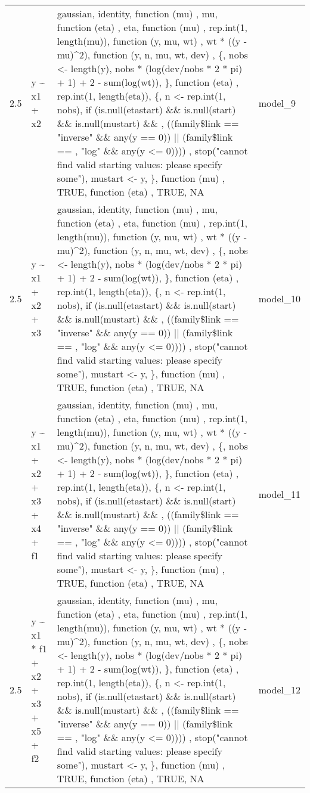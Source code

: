 \begin{tabular}{rlll}
2.5 & y \textasciitilde{} x1 + x2 & gaussian, identity, function (mu) , mu, function (eta) , eta, function (mu) , rep.int(1, length(mu)), function (y, mu, wt) , wt * ((y - mu)\textasciicircum{}2), function (y, n, mu, wt, dev) , \{,     nobs <- length(y),     nobs * (log(dev/nobs * 2 * pi) + 1) + 2 - sum(log(wt)), \}, function (eta) , rep.int(1, length(eta)), \{,     n <- rep.int(1, nobs),     if (is.null(etastart) \&\& is.null(start) \&\& is.null(mustart) \&\& ,         ((family\$link == "inverse" \&\& any(y == 0)) || (family\$link == ,             "log" \&\& any(y <= 0)))) ,         stop("cannot find valid starting values: please specify some"),     mustart <- y, \}, function (mu) , TRUE, function (eta) , TRUE, NA & model\_9\\
2.5 & y \textasciitilde{} x1 + x2 + x3 & gaussian, identity, function (mu) , mu, function (eta) , eta, function (mu) , rep.int(1, length(mu)), function (y, mu, wt) , wt * ((y - mu)\textasciicircum{}2), function (y, n, mu, wt, dev) , \{,     nobs <- length(y),     nobs * (log(dev/nobs * 2 * pi) + 1) + 2 - sum(log(wt)), \}, function (eta) , rep.int(1, length(eta)), \{,     n <- rep.int(1, nobs),     if (is.null(etastart) \&\& is.null(start) \&\& is.null(mustart) \&\& ,         ((family\$link == "inverse" \&\& any(y == 0)) || (family\$link == ,             "log" \&\& any(y <= 0)))) ,         stop("cannot find valid starting values: please specify some"),     mustart <- y, \}, function (mu) , TRUE, function (eta) , TRUE, NA & model\_10\\
\addlinespace
2.5 & y \textasciitilde{} x1 + x2 + x3 + x4 + f1 & gaussian, identity, function (mu) , mu, function (eta) , eta, function (mu) , rep.int(1, length(mu)), function (y, mu, wt) , wt * ((y - mu)\textasciicircum{}2), function (y, n, mu, wt, dev) , \{,     nobs <- length(y),     nobs * (log(dev/nobs * 2 * pi) + 1) + 2 - sum(log(wt)), \}, function (eta) , rep.int(1, length(eta)), \{,     n <- rep.int(1, nobs),     if (is.null(etastart) \&\& is.null(start) \&\& is.null(mustart) \&\& ,         ((family\$link == "inverse" \&\& any(y == 0)) || (family\$link == ,             "log" \&\& any(y <= 0)))) ,         stop("cannot find valid starting values: please specify some"),     mustart <- y, \}, function (mu) , TRUE, function (eta) , TRUE, NA & model\_11\\
2.5 & y \textasciitilde{} x1 * f1 + x2 + x3 + x5 + f2 & gaussian, identity, function (mu) , mu, function (eta) , eta, function (mu) , rep.int(1, length(mu)), function (y, mu, wt) , wt * ((y - mu)\textasciicircum{}2), function (y, n, mu, wt, dev) , \{,     nobs <- length(y),     nobs * (log(dev/nobs * 2 * pi) + 1) + 2 - sum(log(wt)), \}, function (eta) , rep.int(1, length(eta)), \{,     n <- rep.int(1, nobs),     if (is.null(etastart) \&\& is.null(start) \&\& is.null(mustart) \&\& ,         ((family\$link == "inverse" \&\& any(y == 0)) || (family\$link == ,             "log" \&\& any(y <= 0)))) ,         stop("cannot find valid starting values: please specify some"),     mustart <- y, \}, function (mu) , TRUE, function (eta) , TRUE, NA & model\_12\\

\end{tabular}
